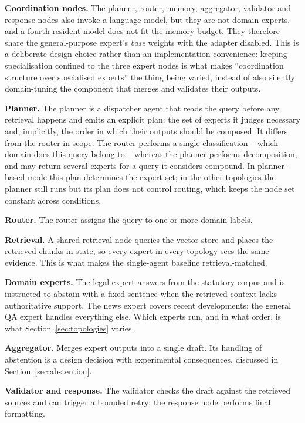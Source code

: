 \documentclass[journal,10pt,compsoc,onecolumn]{IEEEtran}
\begin{document}
\textbf{Coordination nodes.} The planner, router, memory, aggregator, validator
and response nodes also invoke a language model, but they are not domain
experts, and a fourth resident model does not fit the memory budget. They
therefore share the general-purpose expert's \emph{base} weights with the
adapter disabled. This is a deliberate design choice rather than an
implementation convenience: keeping specialisation confined to the three expert
nodes is what makes ``coordination structure over specialised experts'' the thing
being varied, instead of also silently domain-tuning the component that merges
and validates their outputs.

\textbf{Planner.} The planner is a dispatcher agent that reads the query before
any retrieval happens and emits an explicit plan: the set of experts it judges
necessary and, implicitly, the order in which their outputs should be composed.
It differs from the router in scope. The router performs a single
classification -- which domain does this query belong to -- whereas the planner
performs decomposition, and may return several experts for a query it considers
compound. In planner-based mode this plan determines the expert set; in the other
topologies the planner still runs but its plan does not control routing, which
keeps the node set constant across conditions.

\textbf{Router.} The router assigns the query to one or more domain labels.

\textbf{Retrieval.} A shared retrieval node queries the vector store and places
the retrieved chunks in state, so every expert in every topology sees the same
evidence. This is what makes the single-agent baseline retrieval-matched.

\textbf{Domain experts.} The legal expert answers from the statutory corpus and
is instructed to abstain with a fixed sentence when the retrieved context lacks
authoritative support. The news expert covers recent developments; the general QA
expert handles everything else. Which experts run, and in what order, is what
Section~\ref{sec:topologies} varies.

\textbf{Aggregator.} Merges expert outputs into a single draft. Its handling of
abstention is a design decision with experimental consequences, discussed in
Section~\ref{sec:abstention}.

\textbf{Validator and response.} The validator checks the draft against the
retrieved sources and can trigger a bounded retry; the response node performs
final formatting.
\end{document}
